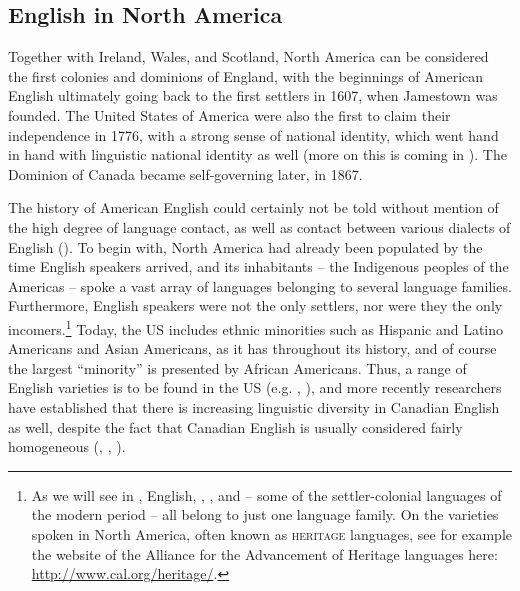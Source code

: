 \subsection{English in North America}\label{English-NA}
Together with Ireland, Wales, and Scotland, North America can be considered the first colonies and dominions of England, with the beginnings of American English ultimately going back to the first settlers in 1607, when Jamestown was founded. The United States of America were also the first to claim their independence in 1776, with a strong sense of national identity, which went hand in hand with linguistic national identity as well (more on this is coming in ). The Dominion of Canada became self-governing later, in 1867.

The history of American English could certainly not be told without mention of the high degree of language contact, as well as contact between various dialects of English (). To begin with, North America had already been populated by the time English speakers arrived, and its inhabitants -- the Indigenous peoples of the Americas -- spoke a vast array of languages belonging to several language families. Furthermore, English speakers were not the only settlers, nor were they the only incomers.\footnote{As we will see in , English, , , and  -- some of the settler-colonial languages of the modern period -- all belong to just one language family. On the varieties spoken in North America, often known as \textsc{heritage} languages, see for example the website of the Alliance for the Advancement of Heritage languages here: \url{http://www.cal.org/heritage/}.} Today, the US includes ethnic minorities such as Hispanic and Latino Americans and Asian Americans, as it has throughout its history, and of course the largest ``minority'' is presented by African Americans. Thus, a range of English varieties is to be found in the US (e.g. \citealp{Wells1982c}, \citealp{WolframSchilling-Estes2015}), and more recently researchers have established that there is increasing linguistic diversity in Canadian English as well, despite the fact that Canadian English is usually considered fairly homogeneous (\citealp{CheshireHardwick1986}, \citealp{Clarke2010}, \citealp{ClarkeElmsYoussef1995}).

